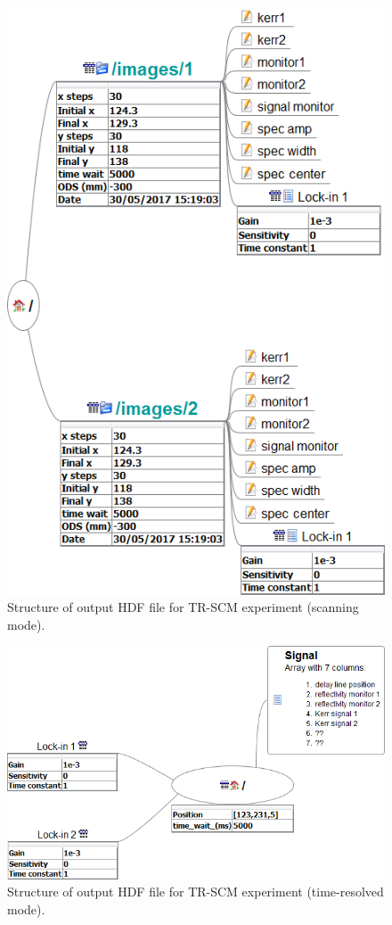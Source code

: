 \documentclass[14pt,a4paper] {article}
\begin{document}
\begin{figure}
\includegraphics[width = 0.8\linewidth]{HDF5-format.png}
\caption{Structure of output HDF file for TR-SCM experiment (scanning mode).}
\end{figure}

\begin{figure}
\includegraphics[width = 0.8\linewidth]{HDF5-format2.png}
\caption{Structure of output HDF file for TR-SCM experiment (time-resolved mode).}
\end{figure}
\end{document}
